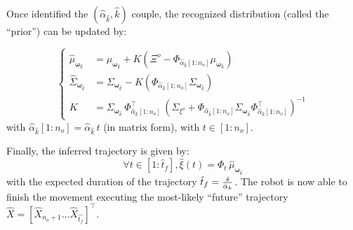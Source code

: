 \documentclass[runningheads,a4paper]{llncs}
\begin{document}
Once identified the $(\hat{\alpha}_{\hat{k}},\hat{k})$ couple, the recognized distribution (called the ``prior'') can be updated by:

\begin{equation} \label{eq:udateWithAlpha}
\left\{
\begin{array}{rl}
\hat{\mu}_{\boldsymbol{\omega}_{\hat{k}}} &= \mu_{\boldsymbol{\omega}_{\hat{k}}}  + K(\Xi^o - \Phi_{\hat{\alpha}_{\hat{k}}[1:{n_o}]}\mu_{\boldsymbol{\omega}_{\hat{k}}} ) \\ 
\hat{\Sigma}_{\boldsymbol{\omega}_{\hat{k}}}  &= \Sigma_{\boldsymbol{\omega}_{\hat{k}}}  - K(\Phi_{\hat{\alpha}_{\hat{k}}[1:{n_o}]} \Sigma_{\boldsymbol{\omega}_{\hat{k}}} ) \\
K&= \Sigma_{\boldsymbol{\omega}_{\hat{k}}} \, \Phi_{\hat{\alpha}_{\hat{k}}[1:{n_o}]}^\top \, (\Sigma_{\xi^o} + \Phi_{\hat{\alpha}_{\hat{k}}[1:n_o]}\Sigma_{\boldsymbol{\omega}_{\hat{k}}}  \Phi_{\hat{\alpha}_{\hat{k}}[1:n_o]}^\top)^{-1}
\end{array}
\right.\end{equation}
with $\hat{\alpha}_{\hat{k}}[1:n_o] = \hat{\alpha}_{\hat{k}} \, t$ (in matrix form), with $t \in [1:n_o]$.

Finally, the inferred trajectory is given by: 
$$\forall t \in [1:\hat{t}_f], \hat{\xi}(t) = \Phi_t \, \hat{\mu}_{\boldsymbol{\omega}_{\hat{k}}}$$
with the expected duration of the trajectory $\hat{t}_f ={\bar{s} \over  \hat{\alpha}_k}$.
The robot is now able to finish the movement executing the most-likely ``future'' trajectory $\hat{X} =[\hat{X}_{n_o+1} \ldots \hat{X}_{\hat{t_{f}}}]^\top$.
\end{document}
